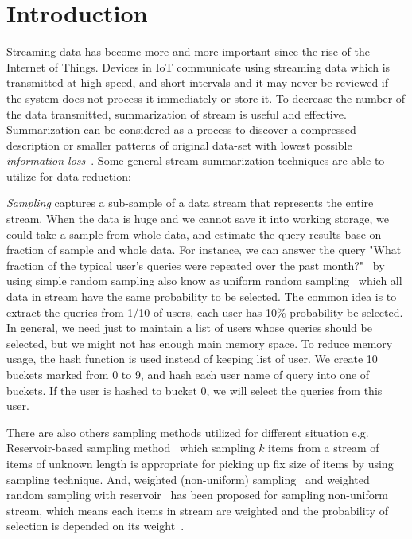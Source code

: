 \section{Introduction}

Streaming data has become more and more important since the rise of the Internet
of Things. Devices in IoT communicate using streaming data which is transmitted
at high speed, and short intervals and it may never be reviewed if the system
does not process it immediately or store it. To decrease the number of the data
transmitted, summarization of stream is useful and effective. Summarization can
be considered as a process to discover a compressed description or smaller
patterns of original data-set with lowest possible \emph{information
loss}~\cite{chandola2007summarization}.
Some general stream summarization techniques are able to utilize for data
reduction:

\emph{Sampling} captures a sub-sample of a data stream that represents the
entire stream. When the data is huge and we cannot save it into working storage,
we could take a sample from whole data, and estimate the query results base on
fraction of sample and whole data. For instance, we can answer the query "What
fraction of the typical user's queries were repeated over the past
month?"~\cite{leskovec2014mining} by using simple random sampling also know as
uniform random sampling~\cite{vitter1984faster, Ahrens1985SequentialRS} which
all data in stream have the same probability to be selected. The common idea is
to extract the queries from 1/10 of users, each user has 10\% probability be
selected. In general, we need just to maintain a list of users whose queries
should be selected, but we might not has enough main memory space. To reduce
memory usage, the hash function is used instead of keeping list of user. We
create 10 buckets marked from 0 to 9, and hash each user name of query into one
of buckets. If the user is hashed to bucket 0, we will select the queries from
this user.

There are also others sampling methods utilized for different situation e.g.
Reservoir-based sampling method~\cite{vitter1985random, vitter1985random,
Aggarwal2007DataS} which sampling $k$ items from a stream of items of unknown
length is appropriate for picking up fix size of items by using sampling
technique. And, weighted (non-uniform) sampling~\cite{chaudhuri1999random} and
weighted random sampling with reservoir~\cite{efraimidis2006weighted} has been
proposed for sampling non-uniform stream, which means each items in stream are
weighted and the probability of selection is depended on its
weight~\cite{chaudhuri1999random}.

